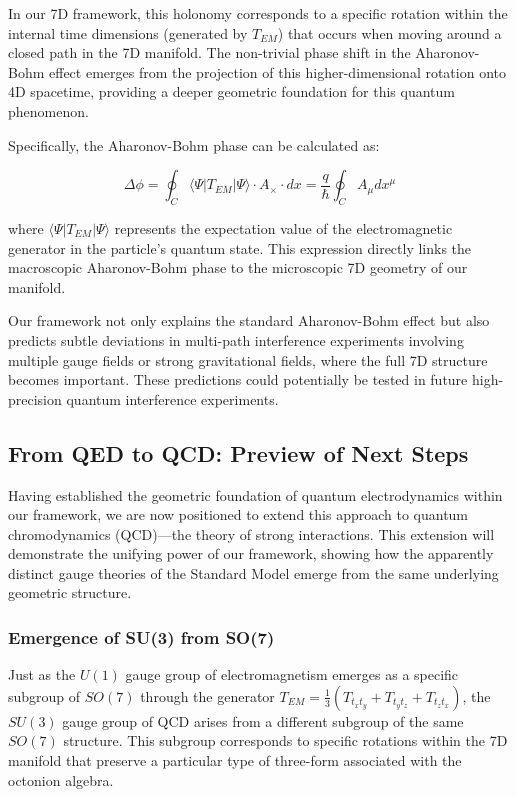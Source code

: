\documentclass{article}
\begin{document}
In our 7D framework, this holonomy corresponds to a specific rotation within the internal time dimensions (generated by $T_{EM}$) that occurs when moving around a closed path in the 7D manifold. The non-trivial phase shift in the Aharonov-Bohm effect emerges from the projection of this higher-dimensional rotation onto 4D spacetime, providing a deeper geometric foundation for this quantum phenomenon.

Specifically, the Aharonov-Bohm phase can be calculated as:

\begin{equation}
\Delta\phi = \oint_C \langle \Psi | T_{EM} | \Psi \rangle \cdot A_{\times} \cdot dx = \frac{q}{\hbar} \oint_C A_\mu dx^\mu
\end{equation}

where $\langle \Psi | T_{EM} | \Psi \rangle$ represents the expectation value of the electromagnetic generator in the particle's quantum state. This expression directly links the macroscopic Aharonov-Bohm phase to the microscopic 7D geometry of our manifold.

Our framework not only explains the standard Aharonov-Bohm effect but also predicts subtle deviations in multi-path interference experiments involving multiple gauge fields or strong gravitational fields, where the full 7D structure becomes important. These predictions could potentially be tested in future high-precision quantum interference experiments.

\subsection{From QED to QCD: Preview of Next Steps}

Having established the geometric foundation of quantum electrodynamics within our framework, we are now positioned to extend this approach to quantum chromodynamics (QCD)—the theory of strong interactions. This extension will demonstrate the unifying power of our framework, showing how the apparently distinct gauge theories of the Standard Model emerge from the same underlying geometric structure.

\subsubsection{Emergence of SU(3) from SO(7)}

Just as the $U(1)$ gauge group of electromagnetism emerges as a specific subgroup of $SO(7)$ through the generator $T_{EM} = \frac{1}{3}(T_{t_x t_y} + T_{t_y t_z} + T_{t_z t_x})$, the $SU(3)$ gauge group of QCD arises from a different subgroup of the same $SO(7)$ structure. This subgroup corresponds to specific rotations within the 7D manifold that preserve a particular type of three-form associated with the octonion algebra.
\end{document}
